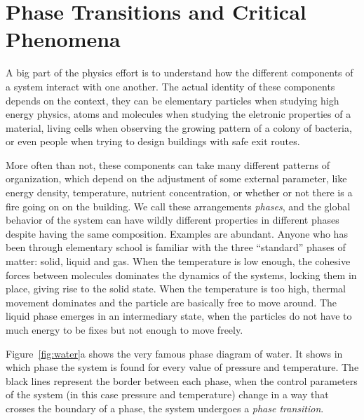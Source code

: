 \chapter{Phase Transitions and Critical Phenomena}
\label{ch2-crit}




A big part of the physics effort is to understand how the different components
of a system interact with one another. The actual identity of these components
depends on the context, they can be elementary particles when studying high
energy physics, atoms and molecules when studying the eletronic properties of a
material, living cells when observing the growing pattern of a colony of
bacteria, or even people when trying to design buildings with safe exit routes.

More often than not, these components can take many different patterns of
organization, which depend on the adjustment of some external parameter, like
energy density, temperature, nutrient concentration, or whether or not there is
a fire going on on the building. We call these arrangements \textit{phases},
and the global behavior of the system can have wildly different properties in
different phases despite having the same composition. Examples are abundant.
Anyone who has been through elementary school is familiar with the three
``standard'' phases of matter: solid, liquid and gas. When the temperature is
low enough, the cohesive forces between molecules dominates the dynamics of the
systems, locking them in place, giving rise to the solid state. When the
temperature is too high, thermal movement dominates and the particle are
basically free to move around. The liquid phase emerges in an intermediary
state, when the particles do not have to much energy to be fixes but not enough
to move freely.

Figure~\ref{fig:water}a shows the very famous phase diagram of water. It shows
in which phase the system is found for every value of pressure and temperature.
The black lines represent the border between each phase, when the control
parameters of the system (in this case pressure and temperature) change in a
way that crosses the boundary of a phase, the system undergoes a \textit{phase
transition}.

